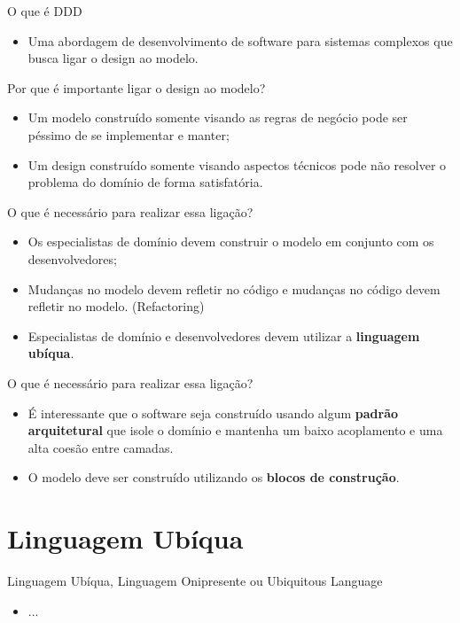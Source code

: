 \documentclass[aspectratio=169]{beamer}
\begin{document}
\begin{frame}{O que é DDD}	
	\begin{itemize}	
		\item Uma abordagem de desenvolvimento de software para sistemas complexos que busca ligar o design ao modelo.
	\end{itemize}
\end{frame}

\begin{frame}{Por que é importante ligar o design ao modelo?}	
	\begin{itemize}	
		\item Um modelo construído somente visando as regras de negócio pode ser péssimo de se implementar e manter;
		\item Um design construído somente visando aspectos técnicos pode não resolver o problema do domínio de forma satisfatória.
	\end{itemize}
\end{frame}

\begin{frame}{O que é necessário para realizar essa ligação?}	
	\begin{itemize}	
		\item Os especialistas de domínio devem construir o modelo em conjunto com os desenvolvedores;
		\item Mudanças no modelo devem refletir no código e mudanças no código devem refletir no modelo. (Refactoring)
		\item Especialistas de domínio e desenvolvedores devem utilizar a \textbf{linguagem ubíqua}.
	\end{itemize}
\end{frame}

\begin{frame}{O que é necessário para realizar essa ligação?}	
	\begin{itemize}	
		\item É interessante que o software seja construído usando algum \textbf{padrão arquitetural} que isole o domínio e mantenha um baixo acoplamento e uma alta coesão entre camadas. 
		\item O modelo deve ser construído utilizando os \textbf{blocos de construção}.
	\end{itemize}
\end{frame}

\section{Linguagem Ubíqua}
\begin{frame}{Linguagem Ubíqua, Linguagem Onipresente ou Ubiquitous Language}	
	\begin{itemize}	
		\item ...
	\end{itemize}
\end{frame}
\end{document}
